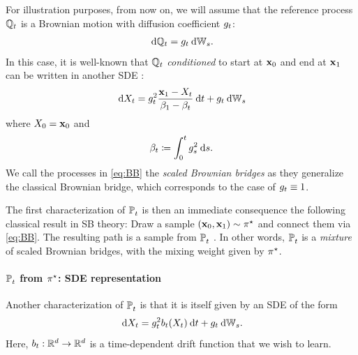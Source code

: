 For illustration purposes, from now on, we will assume that the reference process $\mathbb{Q}_{ t }$ is a Brownian motion with diffusion coefficient $g_{t}$:
\begin{equation}
\label{eq:gtWt}
\dd \refpro = \volat \dWiener.
\end{equation}
In this case, it is well-known that $\mathbb{Q}_{ t }$ \emph{conditioned} to start at $\mathbf{x}_0$ and end at $\mathbf{x}_1$ can be written in another \acrshort{SDE} \citep{mansuy2008aspects, liu2023learning}:
\begin{equation}
\label{eq:BB}
\dd X_t = \volatsq[\ctime] \frac{\x_1-X_t}{\cvolat[\horizon]-\cvolat[\ctime]} \dt + \volat\dWiener
\end{equation}
where $X_0 = \mathbf{x}_0$ and %
\begin{equation}
\beta_{t}\coloneqq \int_0^t g^2_{ s } \:\mathrm{d} s.
\end{equation}We call the processes in \eqref{eq:BB} the \emph{scaled Brownian bridges} as they generalize the classical Brownian bridge, which corresponds to the case of $g_{t} \equiv 1$.

The first characterization of $\mathbb{P}^{}_{ t }$ is then an immediate consequence the following classical result in \acrlong{SB} theory: Draw a sample $(\mathbf{x}_0, \mathbf{x}_1) \sim \pi^\star$ and connect them via \eqref{eq:BB}. The resulting path is a sample from $\mathbb{P}^{}_{ t }$ \citep{leonard2013survey, chen2021stochastic}. In other words, $\mathbb{P}^{}_{ t }$ is a \emph{mixture} of scaled Brownian bridges, with the mixing weight given by $\pi^\star$.


\paragraph{$\mathbb{P}^{}_{ t }$ from $\pi^\star$: SDE representation}



Another characterization of $\mathbb{P}^{}_{ t }$ is that it is itself given by an \acrshort{SDE} of the form \citep{leonard2013survey, chen2021stochastic}
\begin{equation}
\label{eq:SB-SDE}
\dd X_t = \volatsq[\ctime]\fdrift(X_t) \dt + \volat\dWiener.
\end{equation}
Here, $b_t: \mathbb{R}^d \to \mathbb{R}^d$ is a time-dependent drift function that we wish to learn.


